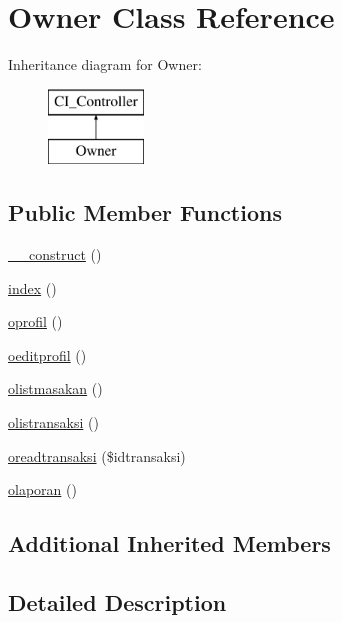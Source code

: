 \hypertarget{class_owner}{}\section{Owner Class Reference}
\label{class_owner}
Inheritance diagram for Owner\+:\begin{figure}[H]
\begin{center}
\leavevmode
\includegraphics[height=2.000000cm]{class_owner}
\end{center}
\end{figure}
\subsection*{Public Member Functions}
\begin{DoxyCompactItemize}
\item 
\mbox{\hyperlink{class_owner_a095c5d389db211932136b53f25f39685}{\+\_\+\+\_\+construct}} ()
\item 
\mbox{\hyperlink{class_owner_a149eb92716c1084a935e04a8d95f7347}{index}} ()
\item 
\mbox{\hyperlink{class_owner_a51b3d019fdb935a5eeb91e911a7abe15}{oprofil}} ()
\item 
\mbox{\hyperlink{class_owner_a73b624717b0d784b3797b7c875b27820}{oeditprofil}} ()
\item 
\mbox{\hyperlink{class_owner_a1a9a10ef9f361c0f8f2329e6bc2b566e}{olistmasakan}} ()
\item 
\mbox{\hyperlink{class_owner_ab6f6db261d765679a6a5acf5024324f5}{olistransaksi}} ()
\item 
\mbox{\hyperlink{class_owner_a84c84dad4d764fb54ea99d0e8643a159}{oreadtransaksi}} (\$idtransaksi)
\item 
\mbox{\hyperlink{class_owner_a948c907807d4481b648fc7aefb6359ab}{olaporan}} ()
\end{DoxyCompactItemize}
\subsection*{Additional Inherited Members}


\subsection{Detailed Description}


